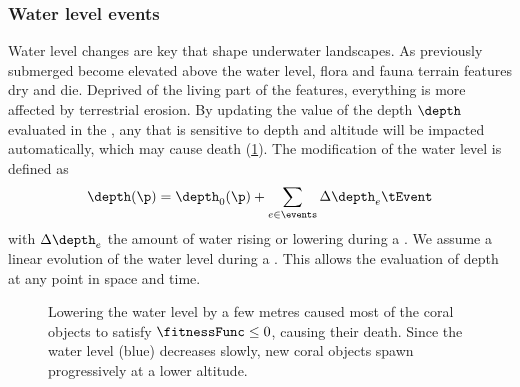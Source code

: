 \subsubsection{Water level events}
Water level changes are key  that shape underwater landscapes. As previously submerged  become elevated above the water level, flora and fauna terrain features dry and die. Deprived of the living part of the features, everything is more affected by terrestrial erosion. By updating the value of the depth $\depth$ evaluated in the , any  that is sensitive to depth and altitude will be impacted automatically, which may cause death (\cref{fig:env-obj-water-event}). The modification of the water level is defined as
\begin{align}
    \depth(\p) = \depth_0(\p) + \sum_{e \in \events} \Delta \depth_e \tEvent
\end{align}
with $\Delta \depth_e$ the amount of water rising or lowering during a . We assume a linear evolution of the water level during a . This allows the evaluation of depth at any point in space and time.

\begin{figure}
    \caption{Lowering the water level by a few metres caused most of the coral objects to satisfy $\fitnessFunc \leq 0$, causing their death. Since the water level (blue) decreases slowly, new coral objects spawn progressively at a lower altitude.}
    \label{fig:env-obj-water-event}
\end{figure}

